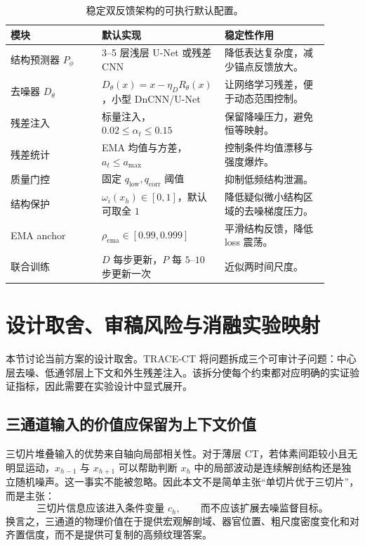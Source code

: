 \documentclass[11pt,a4paper,UTF8,fontset=fandol]{ctexart}
\theoremstyle{definition}
\begin{document}
\begin{table}[htbp]
\centering
\small
\begin{tabular}{p{0.28\linewidth}p{0.30\linewidth}p{0.32\linewidth}}
\toprule
模块 & 默认实现 & 稳定性作用 \\
\midrule
结构预测器 $P_\phi$ & 3--5 层浅层 U-Net 或残差 CNN & 降低表达复杂度，减少锚点反馈放大。 \\
去噪器 $D_\theta$ & $D_\theta(x)=x-\eta_DR_\theta(x)$，小型 DnCNN/U-Net & 让网络学习残差，便于动态范围控制。 \\
残差注入 & 标量注入，$0.02\le\alpha_t\le0.15$ & 保留降噪压力，避免恒等映射。 \\
残差统计 & EMA 均值与方差，$a_t\le a_{\max}$ & 控制条件均值漂移与强度爆炸。 \\
质量门控 & 固定 $q_{\mathrm{low}},q_{\mathrm{corr}}$ 阈值 & 抑制低频结构泄漏。 \\
结构保护 & $\omega_i(x_h)\in[0,1]$，默认可取全 $1$ & 降低疑似微小结构区域的去噪梯度压力。 \\
EMA anchor & $\rho_{\mathrm{ema}}\in[0.99,0.999]$ & 平滑结构反馈，降低 loss 震荡。 \\
联合训练 & $D$ 每步更新，$P$ 每 $5$--$10$ 步更新一次 & 近似两时间尺度。 \\
\bottomrule
\end{tabular}
\caption{稳定双反馈架构的可执行默认配置。}
\label{tab:default-config}
\end{table}



\section{设计取舍、审稿风险与消融实验映射}
\label{sec:design-audit}

本节讨论当前方案的设计取舍。TRACE-CT 将问题拆成三个可审计子问题：中心层去噪、低通邻层上下文和外生残差注入。该拆分使每个约束都对应明确的实证验证指标，因此需要在实验设计中显式展开。

\subsection{三通道输入的价值应保留为上下文价值}

三切片堆叠输入的优势来自轴向局部相关性。对于薄层 CT，若体素间距较小且无明显运动，$x_{h-1}$ 与 $x_{h+1}$ 可以帮助判断 $x_h$ 中的局部波动是连续解剖结构还是独立随机噪声。这一事实不能被忽略。因此本文不是简单主张“单切片优于三切片”，而是主张：
\begin{equation}
    \text{三切片信息应该进入条件变量 }c_h,
    \qquad
    \text{而不应该扩展去噪监督目标。}
\end{equation}
换言之，三通道的物理价值在于提供宏观解剖域、器官位置、粗尺度密度变化和对齐置信度，而不是提供可复制的高频纹理答案。
\end{document}
